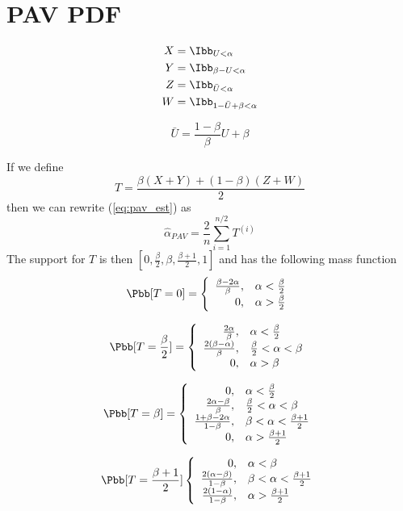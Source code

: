 \section{\ac{PAV} \ac{PDF}}
\begin{align*}
X &= \Ibb_{U<\alpha}\\
Y &= \Ibb_{\beta-U < \alpha}\\
Z &= \Ibb_{\bar{U} < \alpha}\\
W &= \Ibb_{1-\bar{U}+\beta < \alpha}
\end{align*}

\[\bar{U} = \frac{1-\beta}{\beta}U + \beta\] 

If we define
\[T = \frac{\beta(X+Y)+(1-\beta)(Z+W)}{2}\]
then we can rewrite (\ref{eq:pav_est}) as
\[\hat{\alpha}_{PAV} = \frac{2}{n} \sum_{i=1}^{n/2}T^{(i)}\]
The support for $T$ is then $[0,\frac{\beta}{2},\beta,\frac{\beta+1}{2},1]$ and has the following mass function
\begin{displaymath}
\Pbb[T=0]=\left\{\begin{array}{rl}
\frac{\beta-2\alpha}{\beta}, & \alpha < \frac{\beta}{2} \\
0, &\alpha > \frac{\beta}{2}
\end{array}\right.
\end{displaymath}

\begin{displaymath}
\Pbb[T=\frac{\beta}{2}]=\left\{\begin{array}{rl}
\frac{2\alpha}{\beta}, & \alpha < \frac{\beta}{2}\\
\frac{2(\beta-\alpha)}{\beta}, & \frac{\beta}{2} < \alpha < \beta\\
0, & \alpha > \beta
\end{array}\right.
\end{displaymath}

\begin{displaymath}
\Pbb[T=\beta]=\left\{\begin{array}{rl}
0, & \alpha < \frac{\beta}{2}\\
\frac{2\alpha-\beta}{\beta}, & \frac{\beta}{2} < \alpha < \beta\\
\frac{1+\beta-2\alpha}{1-\beta}, & \beta < \alpha < \frac{\beta+1}{2}\\
0, & \alpha > \frac{\beta+1}{2}
\end{array}\right.
\end{displaymath}

\begin{displaymath}
\Pbb[T=\frac{\beta+1}{2}]\left\{\begin{array}{rl}
0, & \alpha < \beta\\
\frac{2(\alpha-\beta)}{1-\beta}, & \beta < \alpha < \frac{\beta + 1}{2}\\
\frac{2(1-\alpha)}{1-\beta}, & \alpha > \frac{\beta + 1}{2}
\end{array}\right.
\end{displaymath}

